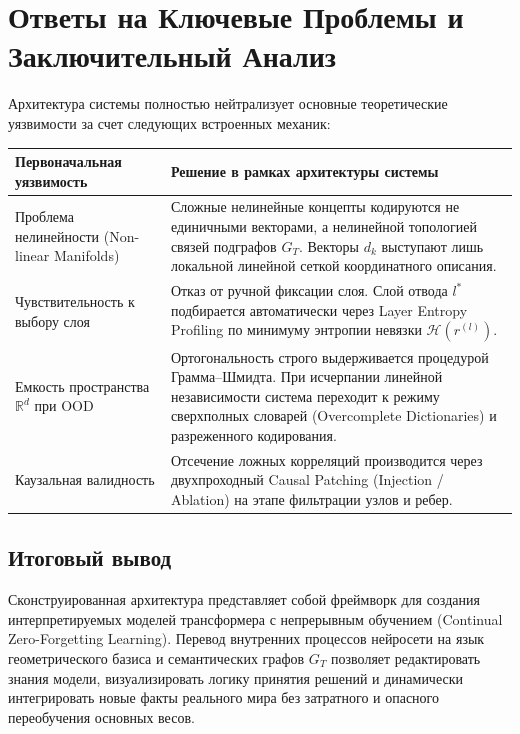 \documentclass[11pt,a4paper]{article}
\begin{document}
\normalsize
\section{Ответы на Ключевые Проблемы и Заключительный Анализ}

Архитектура системы полностью нейтрализует основные теоретические уязвимости за счет следующих встроенных механик:

\begin{table}[H]
\centering
\small
\renewcommand{\arraystretch}{1.25}
\begin{tabular}{>{\raggedright\arraybackslash}p{} >{\raggedright\arraybackslash}p{}}
\toprule
\textbf{Первоначальная уязвимость} & \textbf{Решение в рамках архитектуры системы} \\
\midrule
Проблема нелинейности (Non-linear Manifolds) & Сложные нелинейные концепты кодируются не единичными векторами, а нелинейной топологией связей подграфов $G_T$. Векторы $d_k$ выступают лишь локальной линейной сеткой координатного описания. \\
\addlinespace
Чувствительность к выбору слоя & Отказ от ручной фиксации слоя. Слой отвода $l^*$ подбирается автоматически через Layer Entropy Profiling по минимуму энтропии невязки $\mathcal{H}(r^{(l)})$. \\
\addlinespace
Емкость пространства $\mathbb{R}^d$ при OOD & Ортогональность строго выдерживается процедурой Грамма--Шмидта. При исчерпании линейной независимости система переходит к режиму сверхполных словарей (Overcomplete Dictionaries) и разреженного кодирования. \\
\addlinespace
Каузальная валидность & Отсечение ложных корреляций производится через двухпроходный Causal Patching (Injection / Ablation) на этапе фильтрации узлов и ребер. \\
\bottomrule
\end{tabular}
\end{table}

\subsection*{Итоговый вывод}

Сконструированная архитектура представляет собой фреймворк для создания интерпретируемых моделей трансформера с непрерывным обучением (Continual Zero-Forgetting Learning). Перевод внутренних процессов нейросети на язык геометрического базиса и семантических графов $G_T$ позволяет редактировать знания модели, визуализировать логику принятия решений и динамически интегрировать новые факты реального мира без затратного и опасного переобучения основных весов.
\end{document}
